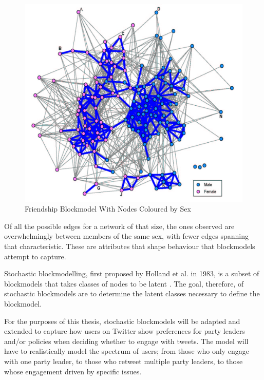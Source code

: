 \begin{singlespacing}
    \begin{figure}[H]
    \centering
    \includegraphics[scale=0.2]{Figures/blockmodel_ex}
    \caption[Friendship Blockmodel With Nodes Coloured by Sex]{Friendship Blockmodel With Nodes Coloured by Sex}
    \label{fig:blockmodel_ex}
    \end{figure}
\end{singlespacing}

Of all the possible edges for a network of that size, the ones observed are
overwhelmingly between members of the same sex, with fewer edges spanning that
characteristic. These are attributes that shape behaviour that blockmodels
attempt to capture. 

Stochastic blockmodelling, first proposed by Holland et al. in 1983, is a subset
of blockmodels that takes classes of nodes to be latent
\cite{holland1983stochastic}. The goal, therefore, of stochastic blockmodels are
to determine the latent classes necessary to define the blockmodel. 

For the purposes of this thesis, stochastic blockmodels will be adapted and
extended to capture how users on Twitter show preferences for party leaders
and/or policies when deciding whether to engage with tweets. The model will have
to realistically model the spectrum of users; from those who only engage with
one party leader, to those who retweet multiple party leaders, to those whose
engagement driven by specific issues. 
	
